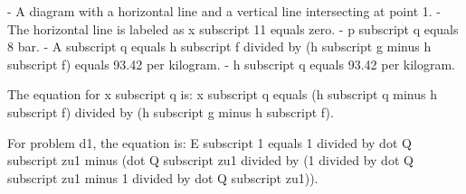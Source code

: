 - A diagram with a horizontal line and a vertical line intersecting at point 1.
- The horizontal line is labeled as x subscript 11 equals zero.
- p subscript q equals 8 bar.
- A subscript q equals h subscript f divided by (h subscript g minus h subscript f) equals 93.42 per kilogram.
- h subscript q equals 93.42 per kilogram.

The equation for x subscript q is:
x subscript q equals (h subscript q minus h subscript f) divided by (h subscript g minus h subscript f).

For problem d1, the equation is:
E subscript 1 equals 1 divided by dot Q subscript zu1 minus (dot Q subscript zu1 divided by (1 divided by dot Q subscript zu1 minus 1 divided by dot Q subscript zu1)).